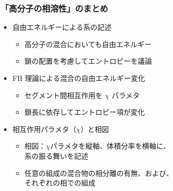 \documentclass[12pt, dvipdfmx]{beamer}
\begin{document}
\begin{frame}
	\frametitle{「高分子の相溶性」のまとめ}
        \begin{boxnote}
            \vspace{-3mm}
            \begin{itemize}
                \item 自由エネルギーによる系の記述
                    \begin{itemize}
                        \item 高分子の混合においても自由エネルギー
                        \item 鎖の配置を考慮してエントロピーを議論
                    \end{itemize} 
                \item FH 理論による混合の自由エネルギー変化
                    \begin{itemize}
                        \item セグメント間相互作用を $\chi$ パラメタ
                        \item 鎖長に依存してエントロピー項が変化
                    \end{itemize} 
                \item 相互作用パラメタ（$\chi$）と相図
                    \begin{itemize}
                        \item 相図：$\chi$パラメタを縦軸、体積分率を横軸に、\\系の振る舞いを記述
                        \item 任意の組成の混合物の相分離の有無、および、\\それぞれの相での組成
                    \end{itemize}
            \end{itemize}
        \end{boxnote}
\end{frame}
\end{document}
